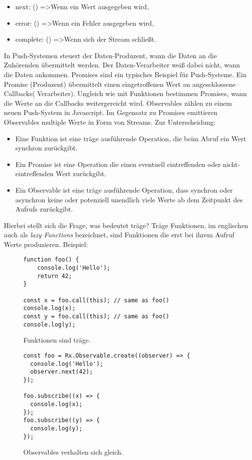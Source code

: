 \begin{itemize}
\item next: () =\textgreater Wenn ein Wert ausgegeben wird,
\item error: () =\textgreater Wenn ein Fehler ausgegeben wird,
\item complete: () =\textgreater Wenn sich der Stream schließt.
\end{itemize}

\noindent
In Push-Systemen steuert der Daten-Produzent, wann die Daten an die Zuhörenden übermittelt werden. Der Daten-Verarbeiter weiß dabei nicht, wann die Daten ankommen. Promises sind ein typisches Beispiel für Push-Systeme. Ein Promise (Produzent) übermittelt einen eingetroffenen Wert an angeschlossene Callbacks( Verarbeiter). Ungleich wie mit Funktionen bestimmen Promises, wann die Werte an die Callbacks weitergereicht wird. Observables zählen zu einem neuen Push-System in Javascript. Im Gegensatz zu Promises emittieren Observables multiple Werte in Form von Streams. Zur Unterscheidung:

\begin{itemize}
\item Eine Funktion ist eine träge ausführende Operation, die beim Abruf ein Wert synchron zurückgibt.
\item Ein Promise ist eine Operation die einen eventuell eintreffenden oder nicht-eintreffenden Wert zurückgibt.
\item Ein Observable ist eine träge ausführende Operation, dass synchron oder asynchron keine oder potenziell unendlich viele Werte ab dem Zeitpunkt des Aufrufs zurückgibt.
\end{itemize}

\noindent
Hierbei stellt sich die Frage, was bedeutet träge? Träge Funktionen, im englischen auch als \textit{lazy Functions} bezeichnet, sind Funktionen die erst bei ihrem Aufruf Werte produzieren. Beispiel:

\begin{figure}[H]
\begin{lstlisting}[basicstyle=\small]
function foo() {
    console.log('Hello');
    return 42;
}

const x = foo.call(this); // same as foo()
console.log(x);
const y = foo.call(this); // same as foo()
console.log(y);
\end{lstlisting}
\caption{Funktionen sind träge. \cite{lazy-functions}}
\end{figure}

\begin{figure}[H]
\begin{lstlisting}[basicstyle=\small]
const foo = Rx.Observable.create((observer) => {
  console.log('Hello');
  observer.next(42);
});

foo.subscribe((x) => {
  console.log(x);
});
foo.subscribe((y) => {
  console.log(y);
});
\end{lstlisting}
\caption{Observables verhalten sich gleich.}
\end{figure}

